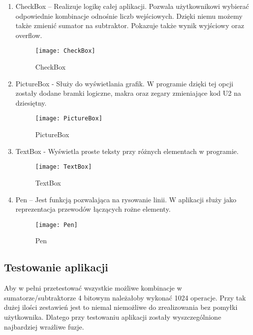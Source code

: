 \documentclass[12pt, a4paper, onside, polish]{article}				%
\begin{document}
 \begin{enumerate}
\item CheckBox – Realizuje logikę całej aplikacji. Pozwala użytkownikowi wybierać odpowiednie kombinacje odnośnie liczb wejściowych. Dzięki niemu możemy także zmienić sumator na subtraktor. Pokazuje także wynik wyjściowy oraz overflow. 
   	\begin{figure}[hbt!]
  	  {\centering \texttt{[image: CheckBox]} \caption{CheckBox}}\vspace{5mm}
  	 \end{figure}
\item PictureBox - Służy do wyświetlania grafik. W programie dzięki tej opcji zostały dodane bramki logiczne, makra oraz zegary zmieniające kod U2 na dziesiętny.
   	\begin{figure}[hbt!]
  	  {\centering \texttt{[image: PictureBox]} \caption{PictureBox}}\vspace{5mm}
  	 \end{figure}
\item TextBox - Wyświetla proste teksty przy różnych elementach w programie.  \newline
   	\begin{figure}[hbt!]
  	  {\centering \texttt{[image: TextBox]} \caption{TextBox}}\vspace{5mm}
  	 \end{figure}
\item Pen – Jest funkcją pozwalająca na rysowanie linii. W aplikacji służy jako reprezentacja przewodów łączących rożne elementy.  
   	\begin{figure}[hbt!]
  	  {\centering \texttt{[image: Pen]} \caption{Pen}}\vspace{5mm}
  	 \end{figure}
 \end{enumerate}



\cleardoublepage

\subsection{Testowanie aplikacji}
\hspace{\parindent}
Aby w pełni przetestować wszystkie możliwe kombinacje w sumatorze/subtraktorze 4 bitowym należałoby wykonać 1024 operacje. Przy tak dużej ilości zestawień jest to niemal niemożliwe do zrealizowania bez pomyłki użytkownika. Dlatego przy testowaniu aplikacji zostały wyszczególnione najbardziej wrażliwe fuzje.  
\end{document}
